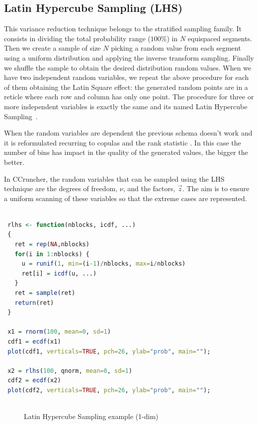 \documentclass[11pt,fleqn]{book} %
\begin{document}
\subsection{Latin Hypercube Sampling (LHS)}
This variance reduction technique 
belongs to the stratified sampling family. It consists in dividing the total 
probability range ($100\%$) in $N$ equispaced segments. Then we create a 
sample of size $N$ picking a random value from each segment using a uniform 
distribution and applying the inverse transform sampling. Finally we shuffle 
the sample to obtain the desired distribution random values. When we have 
two independent random variables, we repeat the above procedure for each of 
them obtaining the Latin Square effect: the generated random points are in
a reticle where each row and column has only one point. The procedure for
three or more independent variables is exactly the same and its named Latin 
Hypercube Sampling~\cite{jorgensen:1998,glasserman:1997}.

When the random variables are dependent the previous schema doesn't work 
and it is reformulated recurring to copulas and the rank statistic 
\cite{wolfgang:2008}. In this case the number of bins has impact in the 
quality of the generated values, the bigger the better.

In CCruncher, the random variables that can be sampled using the LHS 
technique are the degrees of freedom, $\nu$, and the factors, $\vec{z}$. 
The aim is to ensure a uniform scanning of these variables so that the
extreme cases are represented.

\begin{lstlisting}[language=R, label=sc:lhs, caption=Latin Hypercube Sampling example (R script)]

 rlhs <- function(nblocks, icdf, ...) 
 {
   ret = rep(NA,nblocks)
   for(i in 1:nblocks) {
     u = runif(1, min=(i-1)/nblocks, max=i/nblocks)
     ret[i] = icdf(u, ...)
   }
   ret = sample(ret)
   return(ret)
 }

 x1 = rnorm(100, mean=0, sd=1)
 cdf1 = ecdf(x1)
 plot(cdf1, verticals=TRUE, pch=26, ylab="prob", main="");
 
 x2 = rlhs(100, qnorm, mean=0, sd=1)
 cdf2 = ecdf(x2)
 plot(cdf2, verticals=TRUE, pch=26, ylab="prob", main="");
 
\end{lstlisting}
\begin{figure}[!ht]
	\centering
	\caption{Latin Hypercube Sampling example (1-dim)}
	\label{fig:lhs} 
\end{figure}
\end{document}
